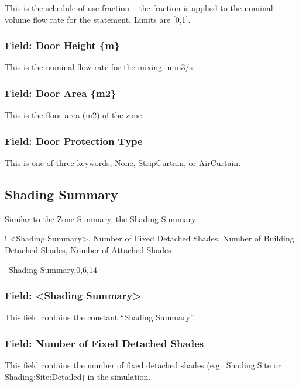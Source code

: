 This is the schedule of use fraction -- the fraction is applied to the nominal volume flow rate for the statement. Limits are {[}0,1{]}.

\subsubsection{Field: Door Height \{m\}}\label{field-door-height-m}

This is the nominal flow rate for the mixing in m3/s.

\subsubsection{Field: Door Area \{m2\}}\label{field-door-area-m2}

This is the floor area (m2) of the zone.

\subsubsection{Field: Door Protection Type}\label{field-door-protection-type}

This is one of three keywords, None, StripCurtain, or AirCurtain.

\subsection{Shading Summary}\label{shading-summary}

Similar to the Zone Summary, the Shading Summary:

! \textless{}Shading Summary\textgreater{}, Number of Fixed Detached Shades, Number of Building Detached Shades, Number of Attached Shades

~Shading Summary,0,6,14

\subsubsection{Field: \textless{}Shading Summary\textgreater{}}\label{field-shading-summary}

This field contains the constant ``Shading Summary''.

\subsubsection{Field: Number of Fixed Detached Shades}\label{field-number-of-fixed-detached-shades}

This field contains the number of fixed detached shades (e.g.~Shading:Site or Shading:Site:Detailed) in the simulation.

